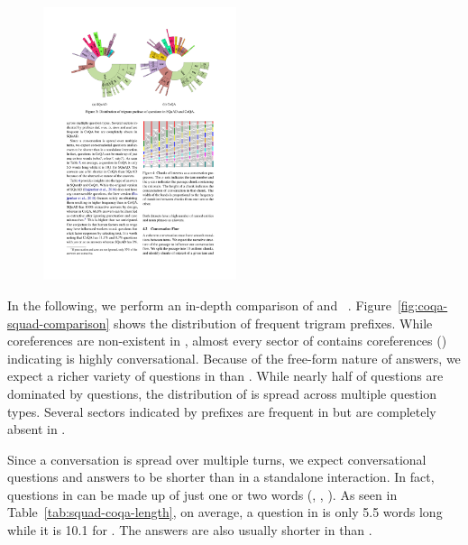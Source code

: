 \begin{figure}[ht]
\begin{center}
\includegraphics[height=8cm]{img/coqa_squad_comparison.pdf}
\end{center}
\end{figure}

In the following, we perform an in-depth comparison of  and ~\cite{rajpurkar2018know}.  Figure~\ref{fig:coqa-squad-comparison} shows the distribution of frequent trigram prefixes. While coreferences are non-existent in , almost every sector of  contains coreferences ()  indicating  is highly conversational. Because of the free-form nature of answers, we expect a richer variety of questions in  than .
While nearly half of  questions are dominated by  questions, the distribution of  is spread across multiple question types. Several sectors indicated by prefixes  are frequent in  but are completely absent in .

Since a conversation is spread over multiple turns, we expect conversational questions and answers to be shorter than in a standalone interaction. In fact, questions in  can be made up of just one or two words (, ,  ).
As seen in Table~\ref{tab:squad-coqa-length}, on average, a question in  is only 5.5 words long while it is 10.1 for . The answers are also usually shorter in  than .

